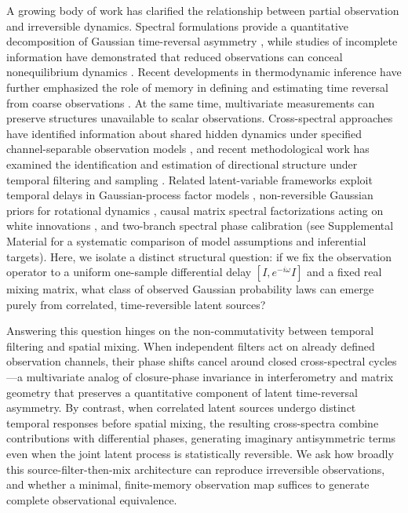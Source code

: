 \documentclass[aps,pre,reprint,amsmath,amssymb,superscriptaddress]{revtex4-2}
\begin{document}
A growing body of work has clarified the relationship between partial observation and irreversible dynamics. Spectral formulations provide a quantitative decomposition of Gaussian time-reversal asymmetry \cite{seara2021}, while studies of incomplete information have demonstrated that reduced observations can conceal nonequilibrium dynamics \cite{lucente2022}. Recent developments in thermodynamic inference have further emphasized the role of memory in defining and estimating time reversal from coarse observations \cite{schwarz2026}. At the same time, multivariate measurements can preserve structures unavailable to scalar observations. Cross-spectral approaches have identified information about shared hidden dynamics under specified channel-separable observation models \cite{bi2026}, and recent methodological work has examined the identification and estimation of directional structure under temporal filtering and sampling \cite{bhandari2026}. Related latent-variable frameworks exploit temporal delays in Gaussian-process factor models \cite{gokcen2015}, non-reversible Gaussian priors for rotational dynamics \cite{rutten2020}, causal matrix spectral factorizations acting on white innovations \cite{ephremidze2007,ephremidze2014}, and two-branch spectral phase calibration \cite{xu2026} (see Supplemental Material \cite{suppinfo} for a systematic comparison of model assumptions and inferential targets). Here, we isolate a distinct structural question: if we fix the observation operator to a uniform one-sample differential delay $[I, e^{-i\omega}I]$ and a fixed real mixing matrix, what class of observed Gaussian probability laws can emerge purely from correlated, time-reversible latent sources?

Answering this question hinges on the non-commutativity between temporal filtering and spatial mixing. When independent filters act on already defined observation channels, their phase shifts cancel around closed cross-spectral cycles---a multivariate analog of closure-phase invariance in interferometry and matrix geometry \cite{thyagarajan2022,chien2016} that preserves a quantitative component of latent time-reversal asymmetry. By contrast, when correlated latent sources undergo distinct temporal responses before spatial mixing, the resulting cross-spectra combine contributions with differential phases, generating imaginary antisymmetric terms even when the joint latent process is statistically reversible. We ask how broadly this source-filter-then-mix architecture can reproduce irreversible observations, and whether a minimal, finite-memory observation map suffices to generate complete observational equivalence.
\end{document}
